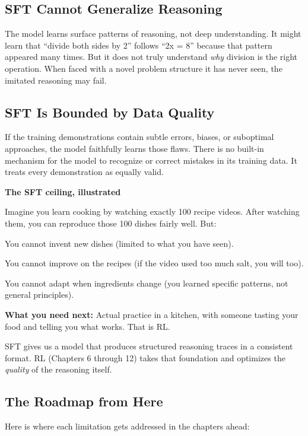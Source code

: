 \begin{chapterenv}
\subsection{SFT Cannot Generalize Reasoning}

The model learns surface patterns of reasoning, not deep understanding. It might learn that ``divide both sides by 2'' follows ``2x = 8'' because that pattern appeared many times. But it does not truly understand \textit{why} division is the right operation. When faced with a novel problem structure it has never seen, the imitated reasoning may fail.

\subsection{SFT Is Bounded by Data Quality}

If the training demonstrations contain subtle errors, biases, or suboptimal approaches, the model faithfully learns those flaws. There is no built-in mechanism for the model to recognize or correct mistakes in its training data. It treats every demonstration as equally valid.

\begin{infobox}
\textbf{The SFT ceiling, illustrated}

Imagine you learn cooking by watching exactly 100 recipe videos. After watching them, you can reproduce those 100 dishes fairly well. But:

You cannot invent new dishes (limited to what you have seen).

You cannot improve on the recipes (if the video used too much salt, you will too).

You cannot adapt when ingredients change (you learned specific patterns, not general principles).

\textbf{What you need next:} Actual practice in a kitchen, with someone tasting your food and telling you what works. That is RL.

SFT gives us a model that produces structured reasoning traces in a consistent format. RL (Chapters 6 through 12) takes that foundation and optimizes the \textit{quality} of the reasoning itself.
\end{infobox}

\subsection{The Roadmap from Here}

Here is where each limitation gets addressed in the chapters ahead:


\end{chapterenv}
